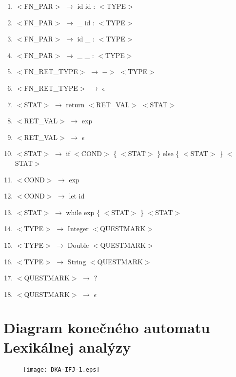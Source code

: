 \documentclass[a4paper,11pt]{article}
\begin{document}
\begin{enumerate}[itemsep=-0.2ex]
    \item $<$FN\_PAR$>$ $\rightarrow$ id id : $<$TYPE$>$
    \item $<$FN\_PAR$>$ $\rightarrow$ \_ id : $<$TYPE$>$
    \item $<$FN\_PAR$>$ $\rightarrow$ id \_ : $<$TYPE$>$
    \item $<$FN\_PAR$>$ $\rightarrow$ \_ \_ : $<$TYPE$>$
    \item $<$FN\_RET\_TYPE$>$ $\rightarrow$ $->$ $<$TYPE$>$
    \item $<$FN\_RET\_TYPE$>$ $\rightarrow$ $\epsilon$
    \item $<$STAT$>$ $\rightarrow$ return $<$RET\_VAL$>$ $<$STAT$>$
    \item $<$RET\_VAL$>$ $\rightarrow$ exp
    \item $<$RET\_VAL$>$ $\rightarrow$ $\epsilon$
    \item $<$STAT$>$ $\rightarrow$ if $<$COND$>$ \{ $<$STAT$>$ \} else \{ $<$STAT$>$ \} $<$STAT$>$
    \item $<$COND$>$ $\rightarrow$ exp
    \item $<$COND$>$ $\rightarrow$ let id
    \item $<$STAT$>$ $\rightarrow$ while exp \{ $<$STAT$>$ \} $<$STAT$>$
    \item $<$TYPE$>$ $\rightarrow$ Integer $<$QUESTMARK$>$
    \item $<$TYPE$>$ $\rightarrow$ Double $<$QUESTMARK$>$
    \item $<$TYPE$>$ $\rightarrow$ String $<$QUESTMARK$>$
    \item $<$QUESTMARK$>$ $\rightarrow$ ?
    \item $<$QUESTMARK$>$ $\rightarrow$ $\epsilon$
\end{enumerate}
\section{Diagram konečného automatu Lexikálnej analýzy}
\begin{figure}[H]
	\centering
	\texttt{[image: DKA-IFJ-1.eps]}
\end{figure}
\end{document}
